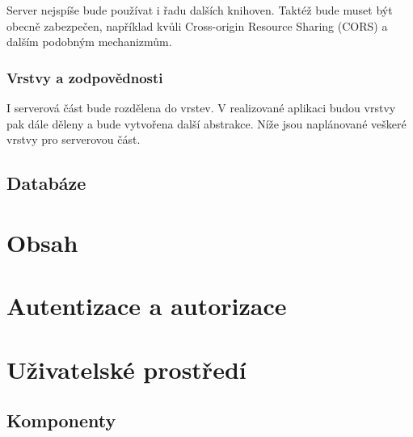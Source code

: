 Server nejspíše bude používat i řadu dalších knihoven.
Taktéž bude muset být obecně zabezpečen, například kvůli Cross-origin Resource Sharing (CORS) a dalším podobným mechanizmům.

\subsubsection{Vrstvy a zodpovědnosti}

I serverová část bude rozdělena do vrstev. 
V realizované aplikaci budou vrstvy pak dále děleny a bude vytvořena další abstrakce.
Níže jsou naplánované veškeré vrstvy pro serverovou část.



\subsection{Databáze}\label{text:navrh/databaze}

\section{Obsah}\label{text:navrh/obsah}

\section{Autentizace a autorizace}\label{text:navrh/auth}

\section{Uživatelské prostředí}

\subsection{Komponenty}

